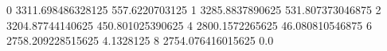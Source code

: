 0 3311.698486328125 557.6220703125
1 3285.8837890625 531.807373046875
2 3204.87744140625 450.801025390625
4 2800.1572265625 46.080810546875
6 2758.209228515625 4.1328125
8 2754.076416015625 0.0
